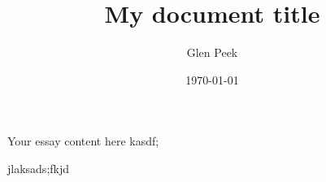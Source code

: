 \documentclass[12pt]{article}
\title{My document title}
\author{Glen Peek}
\date{\today}
\begin{document}
\maketitle
Your essay content here kasdf;

jlaksads;fkjd


\end{document}
